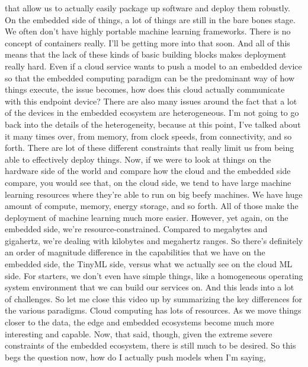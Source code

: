 {{{{{    that allow us to actually easily package up software and deploy them robustly.
    On the embedded side of things, a lot of things
    are still in the bare bones stage.
    We often don't have highly portable machine learning frameworks.
    There is no concept of containers really.
    I'll be getting more into that soon.
    And all of this means that the lack of these kinds of basic building blocks
    makes deployment really hard.
    Even if a cloud service wants to push a model to an embedded device
    so that the embedded computing paradigm can be the predominant way of how
    things execute, the issue becomes, how does this cloud actually
    communicate with this endpoint device?
    There are also many issues around the fact
    that a lot of the devices in the embedded ecosystem are heterogeneous.
    I'm not going to go back into the details of the heterogeneity,
    because at this point, I've talked about it many times over, from memory,
    from clock speeds, from connectivity, and so forth.
    There are lot of these different constraints
    that really limit us from being able to effectively deploy things.
    Now, if we were to look at things on the hardware side of the world
    and compare how the cloud and the embedded side compare,
    you would see that, on the cloud side, we
    tend to have large machine learning resources where they're
    able to run on big beefy machines.
    We have huge amount of compute, memory, energy storage, and so forth.
    All of those make the deployment of machine learning much more easier.
    However, yet again, on the embedded side, we're resource-constrained.
    Compared to megabytes and gigahertz, we're
    dealing with kilobytes and megahertz ranges.
    So there's definitely an order of magnitude difference
    in the capabilities that we have on the embedded side, the TinyML side,
    versus what we actually see on the cloud ML side.
    For starters, we don't even have simple things,
    like a homogeneous operating system environment
    that we can build our services on.
    And this leads into a lot of challenges.
    So let me close this video up by summarizing the key differences
    for the various paradigms.
    Cloud computing has lots of resources.
    As we move things closer to the data, the edge and embedded ecosystems
    become much more interesting and capable.
    Now, that said, though, given the extreme severe constraints
    of the embedded ecosystem, there is still much to be desired.
    So this begs the question now, how do I actually push models when I'm saying,
}}}}}
